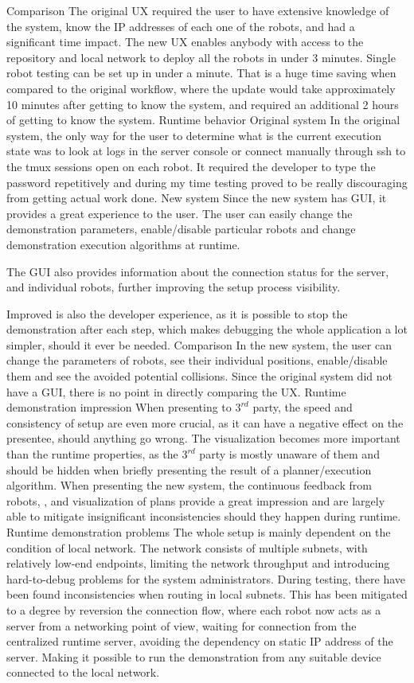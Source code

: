 \secc Comparison
The original UX required the user to have extensive knowledge of the system, know the IP addresses of each one of the robots, and had a significant time impact. The new UX enables anybody with access to the repository and local network to deploy all the robots in under 3 minutes. Single robot testing can be set up in under a minute. That is a huge time saving when compared to the original workflow, where the update would take approximately 10 minutes after getting to know the system, and required an additional 2 hours of getting to know the system.
\sec Runtime behavior
\secc Original system
In the original system, the only way for the user to determine what is the current execution state was to look at logs in the server console or connect manually through ssh to the tmux sessions open on each robot. It required the developer to type the password repetitively and during my time testing proved to be really discouraging from getting actual work done.
\secc New system
Since the new system has GUI, it provides a great experience to the user. The user can easily change the demonstration parameters, enable/disable particular robots and change demonstration execution algorithms at runtime.

The GUI also provides information about the connection status for the server, and individual robots, further improving the setup process visibility.

Improved is also the developer experience, as it is possible to stop the demonstration after each step, which makes debugging the whole application a lot simpler, should it ever be needed.
\secc Comparison
In the new system, the user can change the parameters of robots, see their individual positions, enable/disable them and see the avoided potential collisions. Since the original system did not have a GUI, there is no point in directly comparing the UX. 
\sec Runtime demonstration impression
When presenting to $3^{rd}$ party, the speed and consistency of setup are even more crucial, as it can have a negative effect on the presentee, should anything go wrong. The visualization becomes more important than the runtime properties, as the $3^{rd}$ party is mostly unaware of them and should be hidden when briefly presenting the result of a planner/execution algorithm. When presenting the new system, the continuous feedback from robots, {\vicon}, and visualization of plans provide a great impression and are largely able to mitigate insignificant inconsistencies should they happen during runtime.
\sec Runtime demonstration problems
The whole setup is mainly dependent on the condition of local network. The network consists of multiple subnets, with relatively low-end endpoints, limiting the network throughput and introducing hard-to-debug problems for the system administrators. During testing, there have been found inconsistencies when routing in local subnets. This has been mitigated to a degree by reversion the connection flow, where each robot now acts as a server from a networking point of view, waiting for connection from the centralized runtime server, avoiding the dependency on static IP address of the server. Making it possible to run the demonstration from any suitable device connected to the local network.